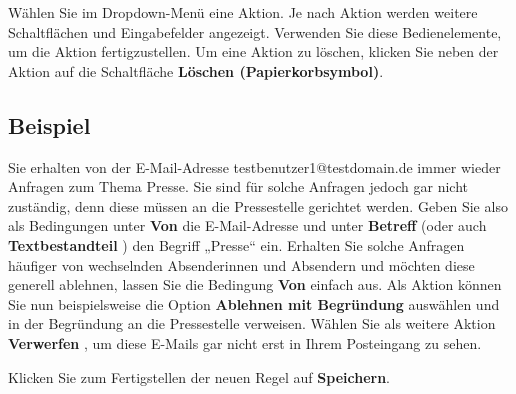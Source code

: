 \documentclass[
  letterpaper,
  DIV=11,
  numbers=noendperiod]{scrreprt}
\begin{document}
Wählen Sie im Dropdown-Menü eine Aktion. Je nach Aktion werden weitere
Schaltflächen und Eingabefelder angezeigt. Verwenden Sie diese
Bedienelemente, um die Aktion fertigzustellen. Um eine Aktion zu
löschen, klicken Sie neben der Aktion auf die Schaltfläche
\textbf{Löschen (Papierkorbsymbol)}.

\subsection{Beispiel}\label{beispiel}

Sie erhalten von der E-Mail-Adresse testbenutzer1@testdomain.de immer
wieder Anfragen zum Thema Presse. Sie sind für solche Anfragen jedoch
gar nicht zuständig, denn diese müssen an die Pressestelle gerichtet
werden. Geben Sie also als Bedingungen unter \textbf{Von} die
E-Mail-Adresse und unter \textbf{Betreff} (oder auch
\textbf{Textbestandteil} ) den Begriff „Presse`` ein. Erhalten Sie
solche Anfragen häufiger von wechselnden Absenderinnen und Absendern und
möchten diese generell ablehnen, lassen Sie die Bedingung \textbf{Von}
einfach aus. Als Aktion können Sie nun beispielsweise die Option
\textbf{Ablehnen mit Begründung} auswählen und in der Begründung an die
Pressestelle verweisen. Wählen Sie als weitere Aktion \textbf{Verwerfen}
, um diese E-Mails gar nicht erst in Ihrem Posteingang zu sehen.

Klicken Sie zum Fertigstellen der neuen Regel auf \textbf{Speichern}.
\end{document}
